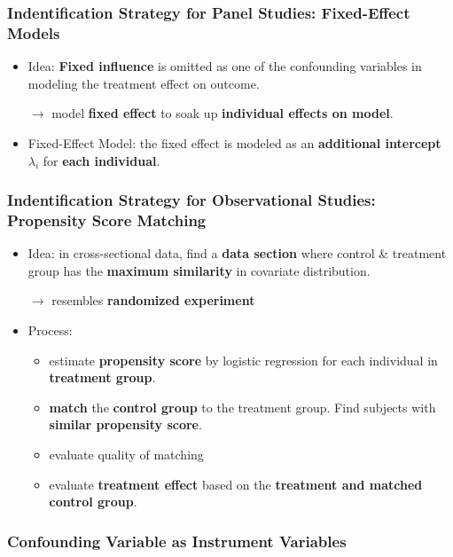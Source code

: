 \subsubsection{Indentification Strategy for Panel Studies: Fixed-Effect Models}
\begin{itemize}
	\item Idea: \textbf{Fixed influence} is omitted as one of the confounding variables in modeling the treatment effect on outcome.
	
	$\rightarrow$ model \textbf{fixed effect} to soak up \textbf{individual effects on model}.
	\item Fixed-Effect Model: the fixed effect is modeled as an \textbf{additional intercept $\lambda_i$} for \textbf{each individual}.
\end{itemize}

\subsubsection{Indentification Strategy for Observational Studies: Propensity Score Matching}
\begin{itemize}
	\item Idea: in cross-sectional data, find a \textbf{data section} where control \& treatment group has the \textbf{maximum similarity} in covariate distribution. 
	
	$\rightarrow$ resembles \textbf{randomized experiment}
	
	\item Process:
	\begin{itemize}
		\item estimate \textbf{propensity score} by logistic regression for each individual in \textbf{treatment group}. 
		\item \textbf{match} the \textbf{control group} to the treatment group. Find subjects with \textbf{similar propensity score}.
		\item evaluate quality of matching
		\item evaluate \textbf{treatment effect} based on the \textbf{treatment and matched control group}.
		
	\end{itemize}
\end{itemize}

\subsubsection{Confounding Variable as Instrument Variables}
